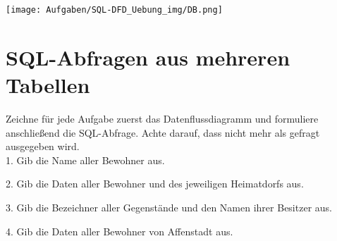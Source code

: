     \begin{center}
        \texttt{[image: Aufgaben/SQL-DFD\_Uebung\_img/DB.png]}
    \end{center}
     

    \section{SQL-Abfragen aus mehreren Tabellen}
    Zeichne für jede Aufgabe zuerst das Datenflussdiagramm und formuliere anschließend die SQL-Abfrage. Achte darauf, dass nicht mehr als gefragt ausgegeben wird.\\


    1. Gib die Name aller Bewohner aus.



    2. Gib die Daten aller Bewohner und des jeweiligen Heimatdorfs aus.



    3. Gib die Bezeichner aller Gegenstände und den Namen ihrer Besitzer aus.



    4. Gib die Daten aller Bewohner von Affenstadt aus.


